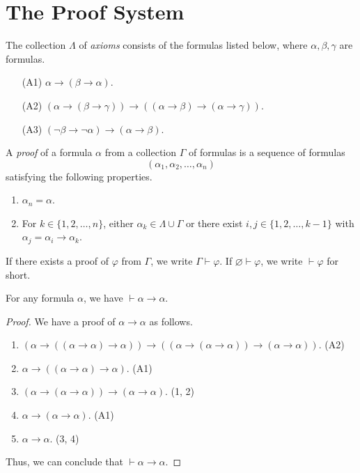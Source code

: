 \section{The Proof System}
\begin{definition}
  The collection $\Lambda$ of \emph{axioms} consists of the formulas listed
  below, where $\alpha, \beta, \gamma$ are formulas.
  \begin{enumerate}[leftmargin=3.5em]
    \item[(A1)] $\alpha \to (\beta \to \alpha)$.
    \item[(A2)] $(\alpha \to (\beta \to \gamma)) \to
    ((\alpha \to \beta) \to (\alpha \to \gamma))$.
    \item[(A3)] $(\neg \beta \to \neg \alpha) \to (\alpha \to \beta)$.
  \end{enumerate}
\end{definition}

\begin{definition}
  A \emph{proof} of a formula $\alpha$ from a collection $\Gamma$ of formulas
  is a sequence of formulas
  \begin{equation*}
    (\alpha_1, \alpha_2, \dots, \alpha_n)
  \end{equation*}
  satisfying the following properties.
  \begin{enumerate}
    \item $\alpha_n = \alpha$.
    \item For $k \in \{1, 2, \dots, n\}$, either
    $\alpha_k \in \Lambda \cup \Gamma$ or there exist
    $i, j \in \{1, 2, \dots, k-1\}$ with $\alpha_j = \alpha_i \to \alpha_k$.
  \end{enumerate}
  If there exists a proof of $\varphi$ from $\Gamma$, we write
  $\Gamma \vdash \varphi$.
  If $\varnothing \vdash \varphi$, we write $\vdash \varphi$ for short.
\end{definition}

\begin{theorem}
  \label{thm:identity}
  For any formula $\alpha$, we have $\vdash \alpha \to \alpha$.
\end{theorem}
\begin{proof}
  We have a proof of $\alpha \to \alpha$ as follows.
  \begin{enumerate}[(1)]
    \item $(\alpha \to ((\alpha \to \alpha) \to \alpha)) \to
    ((\alpha \to (\alpha \to \alpha)) \to (\alpha \to \alpha))$.
    \hfill (A2)
    \item $\alpha \to ((\alpha \to \alpha) \to \alpha)$. \hfill (A1)
    \item $(\alpha \to (\alpha \to \alpha)) \to (\alpha \to \alpha)$.
    \hfill (1, 2)
    \item $\alpha \to (\alpha \to \alpha)$. \hfill (A1)
    \item $\alpha \to \alpha$. \hfill (3, 4)
  \end{enumerate}
  Thus, we can conclude that $\vdash \alpha \to \alpha$.
\end{proof}

